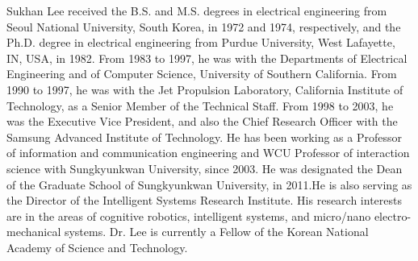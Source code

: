 \documentclass{ieeeaccess}
\begin{document}
\begin{IEEEbiography}{Sukhan Lee}  received the B.S. and M.S. degrees
in electrical engineering from Seoul National
University, South Korea, in 1972 and 1974, respectively, and the Ph.D. degree in electrical engineering from Purdue University, West Lafayette, IN,
USA, in 1982.
From 1983 to 1997, he was with the Departments of Electrical Engineering and of Computer
Science, University of Southern California. From
1990 to 1997, he was with the Jet Propulsion
Laboratory, California Institute of Technology, as a Senior Member of the
Technical Staff. From 1998 to 2003, he was the Executive Vice President,
and also the Chief Research Officer with the Samsung Advanced Institute
of Technology. He has been working as a Professor of information and
communication engineering and WCU Professor of interaction science with
Sungkyunkwan University, since 2003. He was designated the Dean of the
Graduate School of Sungkyunkwan University, in 2011.He is also serving
as the Director of the Intelligent Systems Research Institute. His research
interests are in the areas of cognitive robotics, intelligent systems, and
micro/nano electro-mechanical systems.
Dr. Lee is currently a Fellow of the Korean National Academy of Science
and Technology.
\end{IEEEbiography}

\EOD
\end{document}
